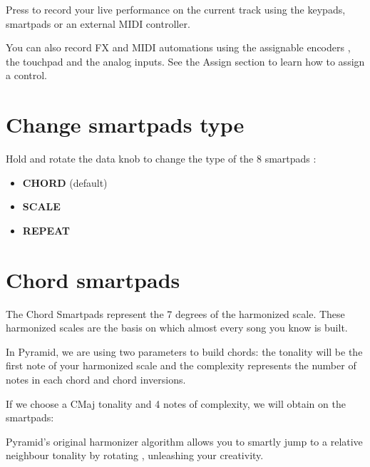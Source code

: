 Press  to record your live performance on the current track using the keypads, smartpads or an external MIDI controller.

You can also record FX and MIDI automations using the assignable encoders \encodersicon{}, the touchpad \touchpadicon{} and the analog inputs. See the Assign section to learn how to assign a control.



\section{Change smartpads type}

Hold  and rotate the data knob \encodericon{} to change the type of the 8 smartpads \smartpadsicon{}:

\begin{itemize}
\item \textbf{CHORD} (default)
\item \textbf{SCALE}
\item \textbf{REPEAT}
\end{itemize}



\section{Chord smartpads}

The Chord Smartpads represent the 7 degrees of the harmonized scale. These harmonized scales are the basis on which almost every song you know is built.

In Pyramid, we are using two parameters to build chords: the tonality will be the first note of your harmonized scale and the complexity represents the number of notes in each chord and chord inversions.

If we choose a CMaj tonality and 4 notes of complexity, we will obtain on the smartpads: 


Pyramid's original harmonizer algorithm allows you to smartly jump to a relative neighbour tonality by rotating \encodericon{}, unleashing your creativity.

